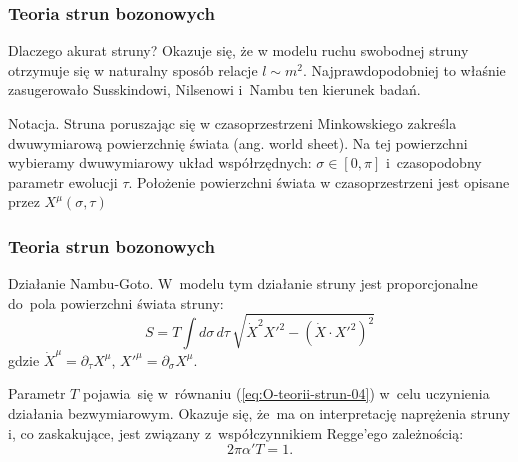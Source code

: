 \documentclass[10pt,t]{beamer}
\begin{document}
\begin{frame}
  \frametitle{Teoria strun bozonowych}


  Dlaczego akurat struny? Okazuje się, że w modelu ruchu swobodnej struny
  otrzymuje się w naturalny sposób relacje $l \sim m^{ 2 }$.
  Najprawdopodobniej to właśnie zasugerowało Susskindowi, Nilsenowi
  i~Nambu ten kierunek badań.

  Notacja. Struna poruszając się w czasoprzestrzeni Minkowskiego zakreśla
  dwuwymiarową powierzchnię świata (ang. world sheet). Na tej
  powierzchni wybieramy dwuwymiarowy układ współrzędnych:
  $\sigma \in [ 0, \pi ]$ i~czasopodobny parametr ewolucji $\tau$.
  Położenie powierzchni świata w czasoprzestrzeni jest opisane przez
  $X^{ \mu }( \sigma, \tau )$

\end{frame}





\begin{frame}
  \frametitle{Teoria strun bozonowych}


  Działanie Nambu-Goto. W~modelu tym działanie struny jest proporcjonalne
  do~pola powierzchni świata struny:
  \begin{equation}
    \label{eq:O-teorii-strun-04}
    S =
    T \int d \sigma \, d \tau \, \sqrt{ \dot{ X }^{ 2 } X'^{ 2 }
      - ( \dot{ X } \cdot X'^{ 2 } )^{ 2 }  }
  \end{equation}
  gdzie $\dot{ X }^{ \mu } = \partial_{ \tau } X^{ \mu }$, $X'^{ \mu } = \partial_{ \sigma } X^{ \mu }$.

  Parametr $T$ pojawia~się w~równaniu (\eqref{eq:O-teorii-strun-04}) w~celu
  uczynienia działania bezwymiarowym. Okazuje się, że~ma on interpretację
  naprężenia struny i, co zaskakujące, jest związany z~współczynnikiem
  Regge’ego zależnością:
  \begin{equation}
    \label{eq:O-teorii-strun-05}
    2 \pi \alpha' T = 1.
  \end{equation}

\end{frame}
\end{document}
